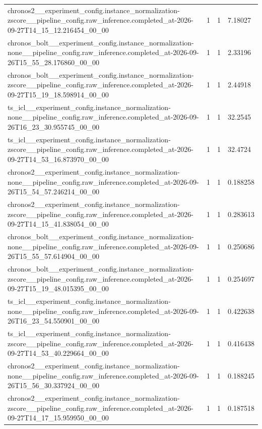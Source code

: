 \begin{tabular}{llll}
chronos2\_\_experiment\_config.instance\_normalization-zscore\_\_pipeline\_config.raw\_inference.completed\_at-2026-09-27T14\_15\_12.216454\_00\_00 & 1 & 1 & 7.18027 \\
chronos\_bolt\_\_experiment\_config.instance\_normalization-none\_\_pipeline\_config.raw\_inference.completed\_at-2026-09-26T15\_55\_28.176860\_00\_00 & 1 & 1 & 2.33196 \\
chronos\_bolt\_\_experiment\_config.instance\_normalization-zscore\_\_pipeline\_config.raw\_inference.completed\_at-2026-09-27T15\_19\_18.598914\_00\_00 & 1 & 1 & 2.44918 \\
ts\_icl\_\_experiment\_config.instance\_normalization-none\_\_pipeline\_config.raw\_inference.completed\_at-2026-09-26T16\_23\_30.955745\_00\_00 & 1 & 1 & 32.2545 \\
ts\_icl\_\_experiment\_config.instance\_normalization-zscore\_\_pipeline\_config.raw\_inference.completed\_at-2026-09-27T14\_53\_16.873970\_00\_00 & 1 & 1 & 32.4724 \\
chronos2\_\_experiment\_config.instance\_normalization-none\_\_pipeline\_config.raw\_inference.completed\_at-2026-09-26T15\_54\_57.246214\_00\_00 & 1 & 1 & 0.188258 \\
chronos2\_\_experiment\_config.instance\_normalization-zscore\_\_pipeline\_config.raw\_inference.completed\_at-2026-09-27T14\_15\_41.838054\_00\_00 & 1 & 1 & 0.283613 \\
chronos\_bolt\_\_experiment\_config.instance\_normalization-none\_\_pipeline\_config.raw\_inference.completed\_at-2026-09-26T15\_55\_57.614904\_00\_00 & 1 & 1 & 0.250686 \\
chronos\_bolt\_\_experiment\_config.instance\_normalization-zscore\_\_pipeline\_config.raw\_inference.completed\_at-2026-09-27T15\_19\_48.015395\_00\_00 & 1 & 1 & 0.254697 \\
ts\_icl\_\_experiment\_config.instance\_normalization-none\_\_pipeline\_config.raw\_inference.completed\_at-2026-09-26T16\_23\_54.550901\_00\_00 & 1 & 1 & 0.422638 \\
ts\_icl\_\_experiment\_config.instance\_normalization-zscore\_\_pipeline\_config.raw\_inference.completed\_at-2026-09-27T14\_53\_40.229664\_00\_00 & 1 & 1 & 0.416438 \\
chronos2\_\_experiment\_config.instance\_normalization-none\_\_pipeline\_config.raw\_inference.completed\_at-2026-09-26T15\_56\_30.337924\_00\_00 & 1 & 1 & 0.188245 \\
chronos2\_\_experiment\_config.instance\_normalization-zscore\_\_pipeline\_config.raw\_inference.completed\_at-2026-09-27T14\_17\_15.959950\_00\_00 & 1 & 1 & 0.187518 \\

\end{tabular}
